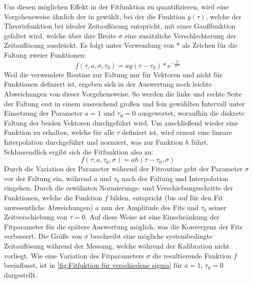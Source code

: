 Um diesen möglichen Effekt in der Fitfunktion zu quantifizieren, wird eine Vorgehensweise ähnlich der in \cite{lasseguesFieldIntensityCorrelations2022} gewählt, bei der die Funktion $y(\tau)$, welche der Theoriefunktion bei idealer Zeitauflösung entspricht, mit einer Gaußfunktion gefaltet wird, welche über ihre Breite $\sigma$ eine zusätzliche Verschlechterung der Zeitauflösung ausdrückt. 
Es folgt unter Verwendung von $*$ als Zeichen für die Faltung zweier Funktionen:
\begin{equation}
    f(\tau, a, \sigma, \tau_0) = ay(\tau - \tau_0) * \mathrm{e}^{-\frac{\tau^2}{2\sigma^2}}
\end{equation}
Weil die verwendete Routine zur Faltung nur für Vektoren und nicht für Funktionen definiert ist, ergeben sich in der Auswertung noch leichte Abweichungen von dieser Vorgehensweise. 
So werden die linke und rechte Seite der Faltung erst in einem ausreichend großen und fein gewählten Intervall unter Einsetzung der Parameter $a=1$ und $\tau_0 = 0$ ausgewertet, woraufhin die diskrete Faltung der beiden Vektoren durchgeführt wird. 
Um anschließend wieder eine Funktion zu erhalten, welche für alle $\tau$ definiert ist, wird erneut eine lineare Interpolation durchgeführt und normiert, was zur Funktion $h$ führt. 
Schlussendlich ergibt sich die Fitfunktion also zu:
\begin{equation}
    f(\tau, a, \tau_0, \sigma) = ah(\tau- \tau_0, \sigma)
    \label{eq:fit funktion final}
\end{equation} 
Durch die Variation der Parameter während der Fitroutine geht der Parameter $\sigma$ vor der Faltung ein, während $a$ und $\tau_0$ nach der Faltung und Interpolation eingehen. 
Durch die erwähnten Normierungs- und Verschiebungsschritte der Funktionen, welche die Funktion $f$ bilden, entspricht (bis auf für den Fit unwesentliche Abweichungen) $a$ nun der Amplitude des Fits und $\tau_0$ seiner Zeitverschiebung von $\tau=0$. 
Auf diese Weise ist eine Einschränkung der Fitparameter für die spätere Auswertung möglich, was die Konvergenz der Fits verbessert. 
Die Größe von $\sigma$ beschreibt eine mögliche systembedingte Zeitauflösung während der Messung, welche während der Kalibration nicht vorliegt. 
Wie eine Variation des Fitparameters $\sigma$ die resultierende Funktion $f$ beeinflusst, ist in \autoref{fig:Fitfuktion für verschiedene sigma} für $a=1$, $\tau_0=0$ dargestellt. 
